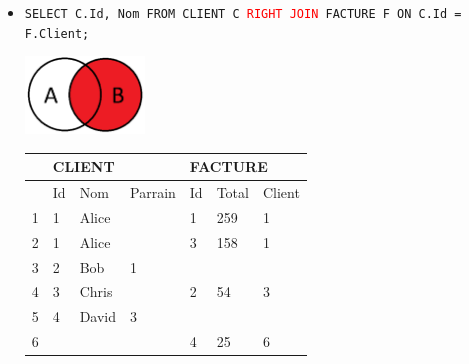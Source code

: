 \documentclass[a4paper]{article}
\begin{document}
\begin{itemize}
\begin{itemize}
    \item \texttt{SELECT C.Id, Nom FROM CLIENT C \textcolor{red}{RIGHT JOIN} FACTURE F ON C.Id = F.Client;}
    \begin{center}
        \includegraphics[width=0.25\textwidth]{../images/right-join-01.PNG}
    \end{center}
    \begin{center}
        \begin{tabular}{|l|l|l|l|l|l|l|} \hline
            & \multicolumn{3}{l|}{CLIENT} & \multicolumn{3}{l|}{FACTURE} \\ \hline
            & Id & Nom & Parrain & Id & Total & Client \\ \hline
            \rowcolor{orange!30}
            1 & 1 & Alice &   & 1 & 259 & 1 \\ \hline
            \rowcolor{orange!30}
            2 & 1 & Alice &   & 3 & 158 & 1 \\ \hline
            3 & 2 &   Bob & 1 &   &     &   \\ \hline
            \rowcolor{orange!30}
            4 & 3 & Chris &   & 2 &  54 & 3 \\ \hline
            5 & 4 & David & 3 &   &     &   \\ \hline
            \rowcolor{orange!30}
            6 &   &       &   & 4 &  25 & 6 \\ \hline
        \end{tabular}
    \end{center}



\end{itemize}
\end{itemize}
\end{document}
